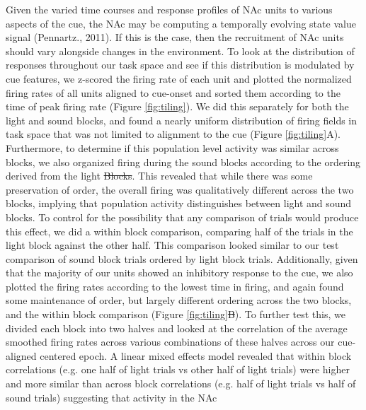 \documentclass[11pt]{article}
\providecommand{\DIFadd}[1]{{\protect\color{blue}\uwave{#1}}} %
\providecommand{\DIFdel}[1]{{\protect\color{red}\sout{#1}}}                      %
\providecommand{\DIFaddbegin}{} %
\providecommand{\DIFaddend}{} %
\providecommand{\DIFdelbegin}{} %
\providecommand{\DIFdelend}{} %
\newcommand{\DIFscaledelfig}{0.5}
\newlength{\DIFdelgraphicswidth} %
\newlength{\DIFdelgraphicsheight} %
\newcommand{\DIFaddincludegraphics}[2][]{{\color{blue}\fbox{\DIFOincludegraphics[#1]{#2}}}} %
\newcommand{\DIFdelincludegraphics}[2][]{%
\sbox{\DIFdelgraphicsbox}{\DIFOincludegraphics[#1]{#2}}%
\settoboxwidth{\DIFdelgraphicswidth}{\DIFdelgraphicsbox} %
\settoboxtotalheight{\DIFdelgraphicsheight}{\DIFdelgraphicsbox} %
\scalebox{\DIFscaledelfig}{%
\parbox[b]{\DIFdelgraphicswidth}{\usebox{\DIFdelgraphicsbox}\\[-\baselineskip] \rule{\DIFdelgraphicswidth}{0em}}\llap{\resizebox{\DIFdelgraphicswidth}{\DIFdelgraphicsheight}{%
\setlength{\unitlength}{\DIFdelgraphicswidth}%
\begin{picture}(1,1)%
\thicklines\linethickness{2pt} %
{\color[rgb]{1,0,0}\put(0,0){\framebox(1,1){}}}%
{\color[rgb]{1,0,0}\put(0,0){\line( 1,1){1}}}%
{\color[rgb]{1,0,0}\put(0,1){\line(1,-1){1}}}%
\end{picture}%
}\hspace*{3pt}}} %
} %
\DeclareRobustCommand{\DIFaddbegin}{\DIFOaddbegin \let\includegraphics\DIFaddincludegraphics} %
\DeclareRobustCommand{\DIFaddend}{\DIFOaddend \let\includegraphics\DIFOincludegraphics} %
\DeclareRobustCommand{\DIFdelbegin}{\DIFOdelbegin \let\includegraphics\DIFdelincludegraphics} %
\DeclareRobustCommand{\DIFdelend}{\DIFOaddend \let\includegraphics\DIFOincludegraphics} %
\begin{document}
Given the varied time courses and response profiles of NAc units to various
aspects of the cue, the NAc may be computing a temporally evolving state value
signal (Pennartz., 2011). If this is the case, then the recruitment of NAc units
should vary alongside changes in the environment. To look at the distribution of
responses throughout our task space and see if this distribution is modulated by
cue features, we z-scored the firing rate of each unit and plotted the
normalized firing rates of all units aligned to cue-onset and sorted them
according to the time of peak firing rate (Figure \ref{fig:tiling}). We did this
separately for both the light and sound blocks, and found a nearly uniform
distribution of firing fields in task space that was not limited to alignment to
the cue (Figure \ref{fig:tiling}A). Furthermore, to determine if this population
level activity was similar across blocks, we also organized firing during the
sound blocks according to the ordering derived from the light \DIFdelbegin \DIFdel{Blocks}\DIFdelend \DIFaddbegin \DIFadd{blocks}\DIFaddend . This revealed that while there was some preservation of order, the overall firing was qualitatively different
across the two blocks, implying that population activity distinguishes between light and sound blocks. To control for the possibility that any comparison of
trials would produce this effect, we did a within block comparison, comparing
half of the trials in the light block against the other half. This comparison
looked similar to our test comparison of sound block trials ordered by light
block trials. Additionally, given that the majority of our units showed an
inhibitory response to the cue, we also plotted the firing rates according to
the lowest time in firing, and again found some maintenance of order, but
largely different ordering across the two blocks, and the within block
comparison (Figure \ref{fig:tiling}\DIFdelbegin \DIFdel{B}\DIFdelend \DIFaddbegin \DIFadd{D}\DIFaddend ). To further test this, we divided each
block into two halves and looked at the correlation of the average smoothed
firing rates across various combinations of these halves across our cue-aligned
centered epoch. A linear mixed effects model revealed that within block
correlations (e.g. one half of light trials vs other half of light trials) were
higher and more similar than across block correlations (e.g. half of light
trials vs half of sound trials) suggesting that activity in the NAc
\end{document}
